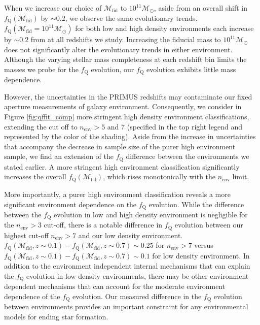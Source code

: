 When we increase our choice of $\mathcal{M}_{\mathrm{fid}}$ to $10^{11}
\mathcal{M}_\odot$, aside from an overall shift in
$f_{\mathrm{Q}}(\mathcal{M}_{\mathrm{fid}})$ by $\sim 0.2$, we observe the
same evolutionary trends. $f_{\mathrm{Q}}(\mathcal{M}_{\mathrm{fid}} =
10^{11}\mathcal{M}_{\odot})$ for both low and high density
environments each increase by $\sim 0.2$ from at all redshifts we
study. Increasing the fiducial mass to $10^{11}
\mathcal{M}_{\odot}$ does not significantly alter the evolutionary
trends in either environment. Although the varying stellar mass
completeness at each redshift bin limits the masses we probe for the
$f_{\mathrm{Q}}$ evolution, our $f_{\mathrm{Q}}$ evolution exhibits little
mass dependence.

However, the uncertainties in the PRIMUS redshifts may contaminate 
our fixed aperture measurements of galaxy environment. Consequently, we consider in Figure
\ref{fig:qffit_comp} more stringent high density environment
classifications, extending the cut off to $n_{\mathrm{env}} > 5$ and
$7$ (specified in the top right legend and represented by the color of
the shading). Aside from the increase in uncertainties that accompany
the decrease in sample size of the purer high environment sample, we
find an extension of the $f_{\mathrm{Q}}$ difference between the
environments we stated earlier. A more stringent high environment
classification significantly increases the overall
$f_{\mathrm{Q}}(\mathcal{M}_{\mathrm{fid}})$, which rises monotonically with
the $n_{\mathrm{env}}$ limit.

More importantly, a purer high environment classification reveals a
more significant environment dependence on the $f_{\mathrm{Q}}$
evolution. While the difference between the $f_{\mathrm{Q}}$ evolution in
low and high density environment is negligible for the $n_{\mathrm{env}} >
3$ cut-off, there is a notable difference in $f_{\mathrm{Q}}$
evolution between our highest cut-off $n_{\mathrm{env}} > 7$ and our low
density environment. $f_{\mathrm{Q}}(\mathcal{M}_{\mathrm{fid}}, z
\sim 0.1) - f_{\mathrm{Q}}(\mathcal{M}_{\mathrm{fid}}, z \sim 0.7)
\sim 0.25$ for $n_{\mathrm{env}} > 7$ versus
$f_{\mathrm{Q}}(\mathcal{M}_{\mathrm{fid}}, z \sim 0.1) -
f_{\mathrm{Q}}(\mathcal{M}_{\mathrm{fid}}, z \sim 0.7) \sim 0.1$ for
low density environment. In addition to the
environment independent internal mechanisms that can explain the
$f_{\mathrm{Q}}$ evolution in low density environments, there may be other
environment dependent mechanisms that can account for the moderate
environment dependence of the $f_{\mathrm{Q}}$ evolution. Our measured
difference in the $f_{\mathrm{Q}}$ evolution between environments provides
an important constraint for any environmental models for ending star
formation.

